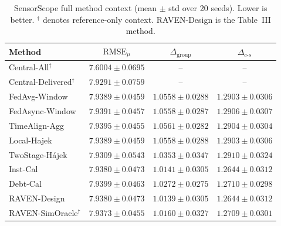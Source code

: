 \begin{table}[!htbp]
\centering
\caption{SensorScope full method context (mean $\pm$ std over 20 seeds).
Lower is better.  $^\dagger$ denotes reference-only context.
RAVEN-Design is the Table~III method.}
\label{tab:app_e3_sensorscope}
\scriptsize
\setlength{\tabcolsep}{3pt}
\begin{tabular*}{\columnwidth}{@{\extracolsep{\fill}}lccc}
\toprule
Method & $\mathrm{RMSE}_{\mu}$ & $\Delta_{\mathrm{group}}$ & $\Delta_{c\text{-}s}$\\
\midrule
Central-All$^{\dagger}$ & $7.6004\pm0.0695$ & -- & -- \\
Central-Delivered$^{\dagger}$ & $7.9291\pm0.0759$ & -- & -- \\
FedAvg-Window & $7.9389\pm0.0459$ & $1.0558\pm0.0288$ & $1.2903\pm0.0306$ \\
FedAsync-Window & $7.9391\pm0.0457$ & $1.0558\pm0.0287$ & $1.2906\pm0.0307$ \\
TimeAlign-Agg & $7.9395\pm0.0455$ & $1.0561\pm0.0282$ & $1.2904\pm0.0304$ \\
Local-Hajek & $7.9389\pm0.0459$ & $1.0558\pm0.0288$ & $1.2903\pm0.0306$ \\
TwoStage-H\'ajek & $7.9309\pm0.0543$ & $1.0353\pm0.0347$ & $1.2910\pm0.0324$ \\
Inst-Cal & $7.9380\pm0.0473$ & $1.0141\pm0.0305$ & $1.2644\pm0.0312$ \\
Debt-Cal & $7.9399\pm0.0463$ & $1.0272\pm0.0275$ & $1.2710\pm0.0298$ \\
RAVEN-Design & $7.9380\pm0.0473$ & $1.0139\pm0.0305$ & $1.2644\pm0.0312$ \\
RAVEN-SimOracle$^{\dagger}$ & $7.9373\pm0.0455$ & $1.0160\pm0.0327$ & $1.2709\pm0.0301$ \\
\bottomrule
\end{tabular*}
\end{table}

